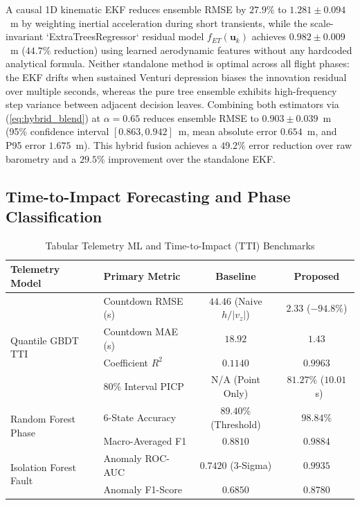 \documentclass[conference]{IEEEtran}
\begin{document}
A causal 1D kinematic EKF reduces ensemble RMSE by $27.9\%$ to $1.281 \pm 0.094$~m by weighting inertial acceleration during short transients, while the scale-invariant `ExtraTreesRegressor` residual model $f_{ET}(\mathbf{u}_k)$ achieves $0.982 \pm 0.009$~m ($44.7\%$ reduction) using learned aerodynamic features without any hardcoded analytical formula. Neither standalone method is optimal across all flight phases: the EKF drifts when sustained Venturi depression biases the innovation residual over multiple seconds, whereas the pure tree ensemble exhibits high-frequency step variance between adjacent decision leaves. Combining both estimators via (\ref{eq:hybrid_blend}) at $\alpha = 0.65$ reduces ensemble RMSE to $0.903 \pm 0.039$~m (95\% confidence interval $[0.863, 0.942]$~m, mean absolute error $0.654$~m, and P95 error $1.675$~m). This hybrid fusion achieves a $49.2\%$ error reduction over raw barometry and a $29.5\%$ improvement over the standalone EKF.

\subsection{Time-to-Impact Forecasting and Phase Classification}

\begin{table}[t]
\centering
\caption{Tabular Telemetry ML and Time-to-Impact (TTI) Benchmarks}
\label{tab:tabular_ml_metrics}
\begin{tabular}{llcc}
\toprule
\textbf{Telemetry Model} & \textbf{Primary Metric} & \textbf{Baseline} & \textbf{Proposed} \\
\midrule
\multirow{4}{*}{Quantile GBDT TTI} & Countdown RMSE (s) & $44.46$ (Naive $h/|v_z|$) & $\mathbf{2.33}$ ($-94.8\%$) \\
 & Countdown MAE (s) & $18.92$ & $\mathbf{1.43}$ \\
 & Coefficient $R^2$ & $0.1140$ & $\mathbf{0.9963}$ \\
 & 80\% Interval PICP & N/A (Point Only) & $\mathbf{81.27\%}$ ($10.01$~s) \\
\midrule
\multirow{2}{*}{Random Forest Phase} & 6-State Accuracy & $89.40\%$ (Threshold) & $\mathbf{98.84\%}$ \\
 & Macro-Averaged F1 & $0.8810$ & $\mathbf{0.9884}$ \\
\midrule
\multirow{2}{*}{Isolation Forest Fault} & Anomaly ROC-AUC & $0.7420$ (3-Sigma) & $\mathbf{0.9935}$ \\
 & Anomaly F1-Score & $0.6850$ & $\mathbf{0.8780}$ \\
\bottomrule
\end{tabular}
\end{table}
\end{document}
